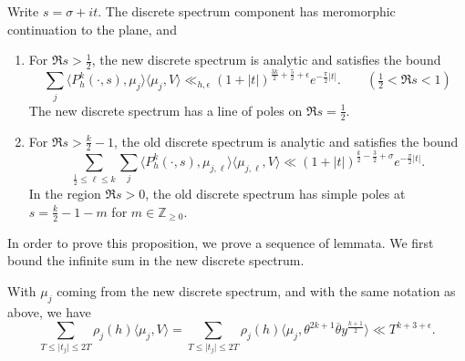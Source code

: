 \begin{proposition}\label{prop:hyperboloid_discrete_props}
  Write $s = \sigma + it$.
  The discrete spectrum component has meromorphic continuation to the plane, and
  \begin{enumerate}

    \item For $\Re s > \frac{1}{2}$, the new discrete spectrum is analytic and satisfies
      the bound
      \begin{equation}
        \sum_j \langle P_h^k(\cdot, s), \mu_j\rangle \langle \mu_j, V \rangle \ll_{h,
        \epsilon} (1 + \lvert t \rvert)^{\frac{3k}{2} + \frac{5}{2} + \epsilon}
        e^{-\frac{\pi}{2} \lvert t \rvert}. \qquad (\tfrac{1}{2} < \Re s < 1)
      \end{equation}
      The new discrete spectrum has a line of poles on $\Re s = \frac{1}{2}$.

    \item For $\Re s > \frac{k}{2} - 1$, the old discrete spectrum is analytic and
      satisfies the bound
      \begin{equation}
        \sum_{\frac{1}{2} \leq \ell \leq k} \sum_j \langle P_h^k(\cdot, s),
        \mu_{j,\ell}\rangle \langle \mu_{j,\ell}, V \rangle \ll (1 + \lvert t
      \rvert)^{\frac{k}{2} - \frac{3}{2} + \sigma} e^{-\frac{\pi}{2}\lvert t \rvert}.
      \end{equation}
      In the region $\Re s > 0$, the old discrete spectrum has simple poles at $s =
      \frac{k}{2} - 1 - m$ for $m \in \mathbb{Z}_{\geq 0}$.

  \end{enumerate}
\end{proposition}


In order to prove this proposition, we prove a sequence of lemmata.
We first bound the infinite sum in the new discrete spectrum.


\begin{lemma}\label{lem:discrete_newspectrum_innerproduct_bound}
  With $\mu_j$ coming from the new discrete spectrum, and with the same notation as above,
  we have
  \begin{equation}
    \sum_{T \leq \lvert t_j \rvert \leq 2T} \rho_j(h) \langle \mu_j, V \rangle = \sum_{T
    \leq \lvert t_j \rvert \leq 2T} \rho_j(h) \langle \mu_j, \theta^{2k+1}
    \overline{\theta} y^{\frac{k+1}{2}} \rangle \ll T^{k + 3 + \epsilon}.
  \end{equation}
\end{lemma}

